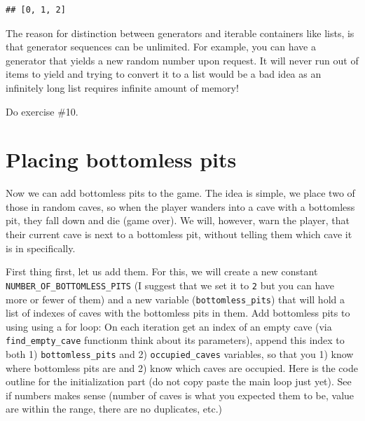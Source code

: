 \documentclass[
]{book}
\begin{document}
\begin{verbatim}
## [0, 1, 2]
\end{verbatim}

The reason for distinction between generators and iterable containers like lists, is that generator sequences can be unlimited. For example, you can have a generator that yields a new random number upon request. It will never run out of items to yield and trying to convert it to a list would be a bad idea as an infinitely long list requires infinite amount of memory!

Do exercise \#10.

\hypertarget{placing-bottomless-pits}{%
\section{Placing bottomless pits}\label{placing-bottomless-pits}}

Now we can add bottomless pits to the game. The idea is simple, we place two of those in random caves, so when the player wanders into a cave with a bottomless pit, they fall down and die (game over). We will, however, warn the player, that their current cave is next to a bottomless pit, without telling them which cave it is in specifically.

First thing first, let us add them. For this, we will create a new constant \texttt{NUMBER\_OF\_BOTTOMLESS\_PITS} (I suggest that we set it to \texttt{2} but you can have more or fewer of them) and a new variable (\texttt{bottomless\_pits}) that will hold a list of indexes of caves with the bottomless pits in them. Add bottomless pits to using using a for loop: On each iteration get an index of an empty cave (via \texttt{find\_empty\_cave} functionm think about its parameters), append this index to both 1) \texttt{bottomless\_pits} and 2) \texttt{occupied\_caves} variables, so that you 1) know where bottomless pits are and 2) know which caves are occupied. Here is the code outline for the initialization part (do not copy paste the main loop just yet). See if numbers makes sense (number of caves is what you expected them to be, value are within the range, there are no duplicates, etc.)
\end{document}

